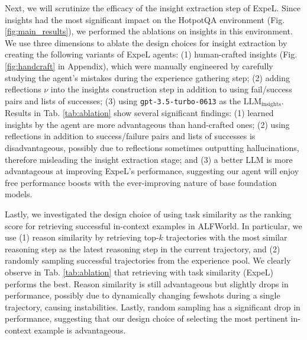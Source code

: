 \documentclass[letterpaper]{article} %
\begin{document}
Next, we will scrutinize the efficacy of the insight extraction step of ExpeL. Since insights had the most significant impact on the HotpotQA environment (Fig. \ref{fig:main_results}), we performed the ablations on insights in this environment. We use three dimensions to ablate the design choices for insight extraction by creating the following variants of ExpeL agents: (1) human-crafted insights (Fig. \ref{fig:handcraft} in Appendix), which were manually engineered by carefully studying the agent's mistakes during the experience gathering step; (2) adding reflections $\nu$ into the insights construction step in addition to using fail/success pairs and lists of successes; (3) using \texttt{gpt-3.5-turbo-0613} as the $\text{LLM}_\text{insights}$. Results in Tab. \ref{tab:ablation} show several significant findings: (1) learned insights by the agent are more advantageous than hand-crafted ones; (2) using reflections in addition to success/failure pairs and lists of successes is disadvantageous, possibly due to reflections sometimes outputting hallucinations, therefore misleading the insight extraction stage; and (3) a better LLM is more advantageous at improving ExpeL's performance, suggesting our agent will enjoy free performance boosts with the ever-improving nature of base foundation models.

Lastly, we investigated the design choice of using task similarity as the ranking score for retrieving successful in-context examples in ALFWorld. In particular, we use (1) reason similarity by retrieving top-$k$ trajectories with the most similar reasoning step as the latest reasoning step in the current trajectory, and (2) randomly sampling successful trajectories from the experience pool. We clearly observe in Tab. \ref{tab:ablation} that retrieving with task similarity (ExpeL) performs the best. Reason similarity is still advantageous but slightly drops in performance, possibly due to dynamically changing fewshots during a single trajectory, causing instabilities. Lastly, random sampling has a significant drop in performance, suggesting that our design choice of selecting the most pertinent in-context example is advantageous.
\end{document}
